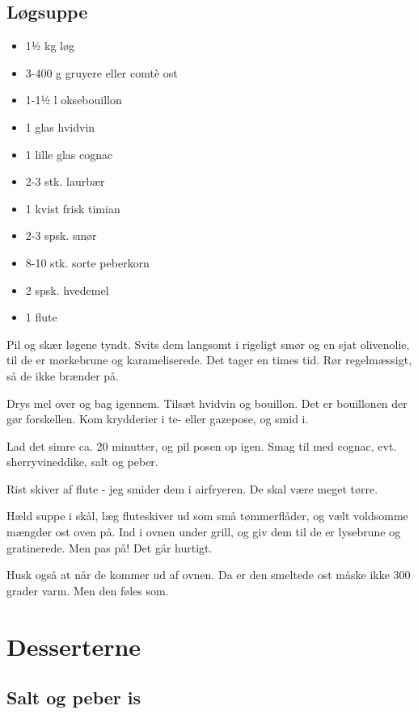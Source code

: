 \documentclass[
]{book}
\providecommand{\tightlist}{%
  \setlength{\itemsep}{0pt}\setlength{\parskip}{0pt}}
\begin{document}
\section{Løgsuppe}\label{luxf8gsuppe}

\begin{itemize}
\tightlist
\item
  1½ kg løg
\item
  3-400 g gruyere eller comtè ost
\item
  1-1½ l oksebouillon
\item
  1 glas hvidvin
\item
  1 lille glas cognac
\item
  2-3 stk. laurbær
\item
  1 kvist frisk timian
\item
  2-3 spsk. smør
\item
  8-10 stk. sorte peberkorn
\item
  2 spsk. hvedemel
\item
  1 flute
\end{itemize}

Pil og skær løgene tyndt. Svits dem langsomt i rigeligt smør og
en sjat olivenolie, til de er mørkebrune og karameliserede. Det tager
en times tid. Rør regelmæssigt, så de ikke brænder på.

Drys mel over og bag igennem. Tilsæt hvidvin og bouillon. Det er bouillonen
der gør forskellen. Kom krydderier i te- eller gazepose, og smid i.

Lad det simre ca. 20 minutter, og pil posen op igen. Smag til med
cognac, evt. sherryvineddike, salt og peber.

Rist skiver af flute - jeg smider dem i airfryeren. De skal være meget
tørre.

Hæld suppe i skål, læg fluteskiver ud som små tømmerflåder, og vælt
voldsomme mængder ost oven på. Ind i ovnen under grill, og giv dem til
de er lysebrune og gratinerede. Men pas på! Det går hurtigt.

Husk også at når de kommer ud af ovnen. Da er den smeltede ost måske ikke
300 grader varm. Men den føles som.

\chapter{Desserterne}\label{desserterne}

\section{Salt og peber is}\label{salt-og-peber-is}
\end{document}
